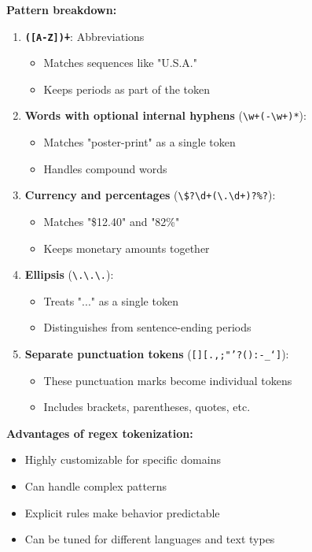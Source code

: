\documentclass[11pt,a4paper]{article}
\theoremstyle{definition}
\theoremstyle{plain}
\theoremstyle{remark}
\begin{document}
\textbf{Pattern breakdown:}
\begin{enumerate}
    \item \textbf{\texttt{([A-Z]\.)+}}: Abbreviations
    \begin{itemize}
        \item Matches sequences like "U.S.A."
        \item Keeps periods as part of the token
    \end{itemize}
    
    \item \textbf{Words with optional internal hyphens} (\texttt{\textbackslash w+(-\textbackslash w+)*}):
    \begin{itemize}
        \item Matches "poster-print" as a single token
        \item Handles compound words
    \end{itemize}
    
    \item \textbf{Currency and percentages} (\texttt{\textbackslash\$?\textbackslash d+(\textbackslash.\textbackslash d+)?\%?}):
    \begin{itemize}
        \item Matches "\$12.40" and "82\%"
        \item Keeps monetary amounts together
    \end{itemize}
    
    \item \textbf{Ellipsis} (\texttt{\textbackslash.\textbackslash.\textbackslash.}):
    \begin{itemize}
        \item Treats "..." as a single token
        \item Distinguishes from sentence-ending periods
    \end{itemize}
    
    \item \textbf{Separate punctuation tokens} (\texttt{[][.,;"'?():-\_`]}):
    \begin{itemize}
        \item These punctuation marks become individual tokens
        \item Includes brackets, parentheses, quotes, etc.
    \end{itemize}
\end{enumerate}

\textbf{Advantages of regex tokenization:}
\begin{itemize}
    \item Highly customizable for specific domains
    \item Can handle complex patterns
    \item Explicit rules make behavior predictable
    \item Can be tuned for different languages and text types
\end{itemize}
\end{document}
